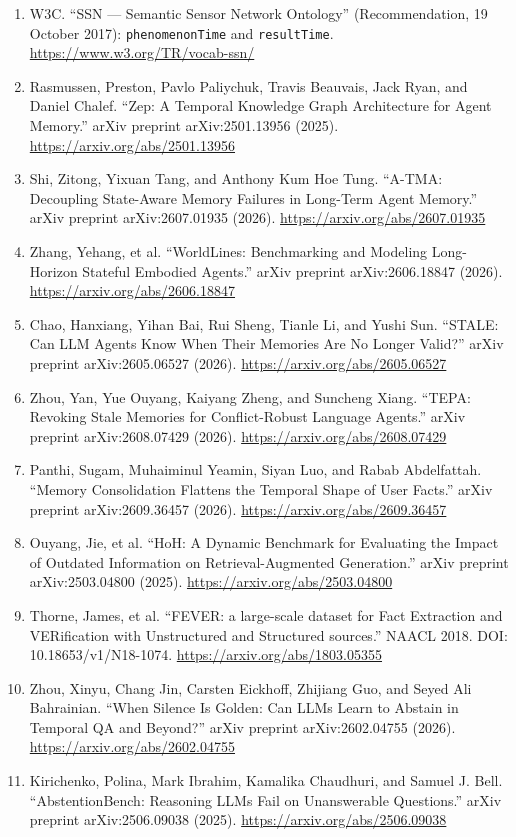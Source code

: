 \documentclass[11pt]{article}
\begin{document}
\begin{enumerate}[leftmargin=*]
\item W3C. ``SSN --- Semantic Sensor Network Ontology'' (Recommendation, 19 October 2017): \texttt{phenomenonTime} and \texttt{resultTime}. \url{https://www.w3.org/TR/vocab-ssn/}
\item Rasmussen, Preston, Pavlo Paliychuk, Travis Beauvais, Jack Ryan, and Daniel Chalef. ``Zep: A Temporal Knowledge Graph Architecture for Agent Memory.'' arXiv preprint arXiv:2501.13956 (2025). \url{https://arxiv.org/abs/2501.13956}
\item Shi, Zitong, Yixuan Tang, and Anthony Kum Hoe Tung. ``A-TMA: Decoupling State-Aware Memory Failures in Long-Term Agent Memory.'' arXiv preprint arXiv:2607.01935 (2026). \url{https://arxiv.org/abs/2607.01935}
\item Zhang, Yehang, et al. ``WorldLines: Benchmarking and Modeling Long-Horizon Stateful Embodied Agents.'' arXiv preprint arXiv:2606.18847 (2026). \url{https://arxiv.org/abs/2606.18847}
\item Chao, Hanxiang, Yihan Bai, Rui Sheng, Tianle Li, and Yushi Sun. ``STALE: Can LLM Agents Know When Their Memories Are No Longer Valid?'' arXiv preprint arXiv:2605.06527 (2026). \url{https://arxiv.org/abs/2605.06527}
\item Zhou, Yan, Yue Ouyang, Kaiyang Zheng, and Suncheng Xiang. ``TEPA: Revoking Stale Memories for Conflict-Robust Language Agents.'' arXiv preprint arXiv:2608.07429 (2026). \url{https://arxiv.org/abs/2608.07429}
\item Panthi, Sugam, Muhaiminul Yeamin, Siyan Luo, and Rabab Abdelfattah. ``Memory Consolidation Flattens the Temporal Shape of User Facts.'' arXiv preprint arXiv:2609.36457 (2026). \url{https://arxiv.org/abs/2609.36457}
\item Ouyang, Jie, et al. ``HoH: A Dynamic Benchmark for Evaluating the Impact of Outdated Information on Retrieval-Augmented Generation.'' arXiv preprint arXiv:2503.04800 (2025). \url{https://arxiv.org/abs/2503.04800}
\item Thorne, James, et al. ``FEVER: a large-scale dataset for Fact Extraction and VERification with Unstructured and Structured sources.'' NAACL 2018. DOI: 10.18653/v1/N18-1074. \url{https://arxiv.org/abs/1803.05355}
\item Zhou, Xinyu, Chang Jin, Carsten Eickhoff, Zhijiang Guo, and Seyed Ali Bahrainian. ``When Silence Is Golden: Can LLMs Learn to Abstain in Temporal QA and Beyond?'' arXiv preprint arXiv:2602.04755 (2026). \url{https://arxiv.org/abs/2602.04755}
\item Kirichenko, Polina, Mark Ibrahim, Kamalika Chaudhuri, and Samuel J. Bell. ``AbstentionBench: Reasoning LLMs Fail on Unanswerable Questions.'' arXiv preprint arXiv:2506.09038 (2025). \url{https://arxiv.org/abs/2506.09038}

\end{enumerate}
\end{document}
